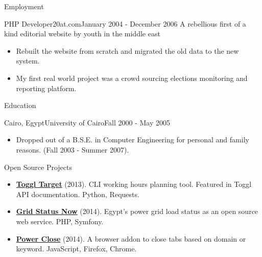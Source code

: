 \documentclass[]{mosabcv}
\begin{document}
\begin{cvsection}{Employment}
        \begin{cvsubsection}{PHP Developer}{20at.com}{January 2004 - December 2006}
            A rebellious first of a kind editorial website by youth in the middle east
            \begin{itemize}
                \item Rebuilt the website from scratch and migrated the old data to the new system.
                \item My first real world project was a crowd sourcing elections monitoring and reporting platform.
            \end{itemize}
        \end{cvsubsection}

    \end{cvsection}

    \begin{cvsection}{Education}
        \begin{cvsubsection}{Cairo, Egypt}{University of Cairo}{Fall 2000 - May 2005}
            \begin{itemize}
                \item Dropped out of a B.S.E. in Computer Engineering for personal and family reasons. (Fall 2003 - Summer 2007).
            \end{itemize}
        \end{cvsubsection}
    \end{cvsection}

    \begin{cvsection}{Open Source Projects}
        \begin{cvsubsection}{}{}{}
            \begin{itemize}
                \item \textbf{\href{https://github.com/mos3abof/toggl_target}{Toggl Target}} (2013). CLI working hours planning tool. Featured in Toggl API documentation. Python, Requests.
                \item \textbf{\href{https://www.gridstatusnow.com}{Grid Status Now}} (2014). Egypt's power grid load status as an open source web service. PHP, Symfony.
                \item \textbf{\href{https://power-close.com/}{Power Close}} (2014). A browser addon to close tabs based on domain or keyword. JavaScript, Firefox, Chrome.
            \end{itemize}
        \end{cvsubsection}
    \end{cvsection}
\end{document}
